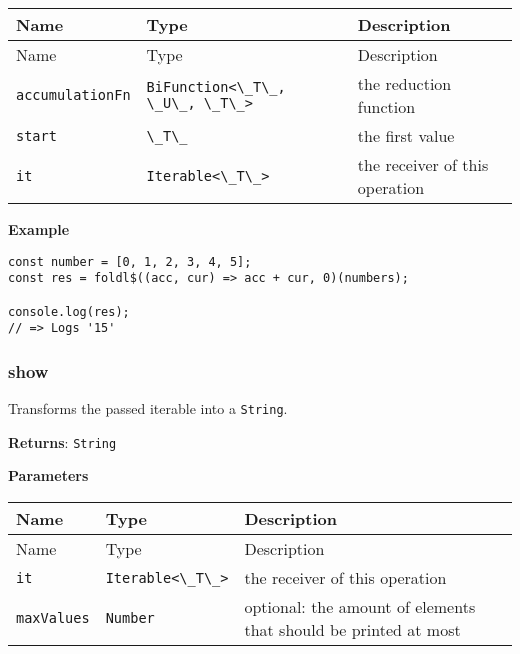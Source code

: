 \begin{longtable}[]{
  >{\raggedright\arraybackslash}p{}
  >{\raggedright\arraybackslash}p{}
  >{\raggedright\arraybackslash}p{}@{}}

\toprule\noalign{}
Name & Type & Description \\
\midrule\noalign{}
\endfirsthead
\toprule\noalign{}
Name & Type & Description \\
\midrule\noalign{}
\endhead
\bottomrule\noalign{}
\endlastfoot
\passthrough{\lstinline!accumulationFn!} &
\passthrough{\lstinline!BiFunction<\_T\_, \_U\_, \_T\_>!} & the
reduction function \\
\passthrough{\lstinline!start!} & \passthrough{\lstinline!\_T\_!} & the
first value \\
\passthrough{\lstinline!it!} & \passthrough{\lstinline!Iterable<\_T\_>!}
& the receiver of this operation \\
\end{longtable}

\textbf{Example}

\begin{lstlisting}[label=bb223e1b-3689-41f0-8cd6-ff38d5b3a40b]
const number = [0, 1, 2, 3, 4, 5];
const res = foldl$((acc, cur) => acc + cur, 0)(numbers);
                                                        
console.log(res);
// => Logs '15'
\end{lstlisting}

\hypertarget{6a4d6129-8352-449e-84de-cb0b60fbf845}{%
\subsubsection{show}\label{6a4d6129-8352-449e-84de-cb0b60fbf845}}

Transforms the passed iterable into a \passthrough{\lstinline!String!}.

\textbf{Returns}: \passthrough{\lstinline!String!}

\textbf{Parameters}

\begin{longtable}[]{
  >{\raggedright\arraybackslash}p{}
  >{\raggedright\arraybackslash}p{}
  >{\raggedright\arraybackslash}p{}@{}}

\toprule\noalign{}
Name & Type & Description \\
\midrule\noalign{}
\endfirsthead
\toprule\noalign{}
Name & Type & Description \\
\midrule\noalign{}
\endhead
\bottomrule\noalign{}
\endlastfoot
\passthrough{\lstinline!it!} & \passthrough{\lstinline!Iterable<\_T\_>!}
& the receiver of this operation \\
\passthrough{\lstinline!maxValues!} & \passthrough{\lstinline!Number!} &
optional: the amount of elements that should be printed at most \\
\end{longtable}

